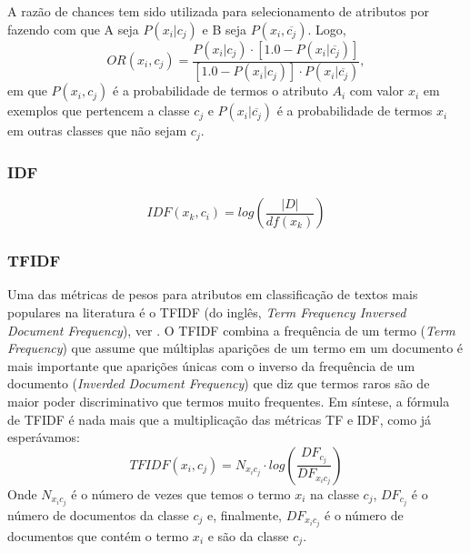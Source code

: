 A razão de chances tem sido utilizada para selecionamento de atributos por \cite{dunja98} fazendo com que A seja $P(x_i|c_j)$ e B seja $P(x_i,\overline{c_j})$. Logo,
\begin{equation}\label{eqn::or}
   OR(x_i, c_j) = \frac{ P(x_i|c_j) \cdot [ 1.0 - P(x_i|\overline{c_j}) ] }{ [ 1.0 - P(x_i|c_j) ] \cdot P(x_i|\overline{c_j})},
\end{equation}
em que $P(x_i, c_j)$ é a probabilidade de termos o atributo $A_i$ com valor $x_i$ em exemplos que pertencem a classe $c_j$ e $P(x_i|\overline{c_j})$ é a probabilidade de termos $x_i$ em outras classes que não sejam $c_j$.

\subsubsection{IDF}
\label{subsubsection::idf}

\cite{ChihHow04}
\begin{equation}\label{eqn::tficf}
   IDF(x_k, c_i) = log( \frac{|D|} {df(x_k)} )
\end{equation}

\subsubsection{TFIDF}
\label{subsubsection::tfidf}

Uma das métricas de pesos para atributos em classificação de textos mais populares na literatura é o TFIDF (do inglês, \textit{Term Frequency Inversed Document Frequency}), ver \cite{salton87}. O TFIDF combina a frequência de um termo (\textit{Term Frequency}) que assume que múltiplas aparições de um termo em um documento é mais importante que aparições únicas com o inverso da frequência de um documento (\textit{Inverded Document Frequency}) que diz que termos raros são de maior poder discriminativo que termos muito frequentes. Em síntese, a fórmula de TFIDF é nada mais que a multiplicação das métricas TF e IDF, como já esperávamos:
\begin{equation}\label{eqn::tficf}
   TFIDF(x_i, c_j) =  N_{x_ic_j} \cdot log( \frac{DF_{c_j}}{ DF_{x_ic_j} } )
\end{equation}
Onde $N_{x_ic_j}$ é o número de vezes que temos o termo $x_i$ na classe $c_j$, $DF_{c_j}$ é o número de documentos da classe $c_j$ e, finalmente, $DF_{x_ic_j}$ é o número de documentos que contém o termo $x_i$ e são da classe $c_j$.

